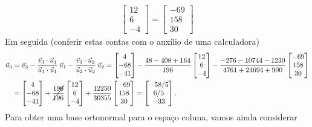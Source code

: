 \documentclass[../livro.tex]{subfiles}  %
\begin{document}
\begin{example}
\begin{equation}
\begin{split}
\begin{bmatrix}
12 \\
6 \\
-4
\end{bmatrix} =
\begin{bmatrix}
 -69  \\
 158  \\
 30
\end{bmatrix}
\end{split}
\end{equation} Em seguida (conferir estas contas com o auxílio de uma calculadora)
\begin{equation}
\begin{split}
\vec{u}_3 & = \vec{v}_3 - \frac{\vec{v}_3 \cdot \vec{u}_1}{\vec{u}_1 \cdot \vec{u}_1} \, \vec{u}_1 - \frac{\vec{v}_3 \cdot \vec{u}_2}{\vec{u}_2 \cdot \vec{u}_2} \, \vec{u}_2 = \begin{bmatrix}
  4 \\
 -68 \\
 -41
\end{bmatrix} - \frac{48-408 + 164}{196}
\begin{bmatrix}
12 \\
6 \\
-4
\end{bmatrix} - \frac{-276 - 10744 - 1230}{4761 + 24694 + 900}
\begin{bmatrix}
 -69  \\
 158  \\
 30
\end{bmatrix} \\
   & = \begin{bmatrix}
  4 \\
 -68 \\
 -41
\end{bmatrix} + \cancel{\frac{196}{196}}
\begin{bmatrix}
12 \\
6 \\
-4
\end{bmatrix} + \frac{12250}{30355}
\begin{bmatrix}
 -69  \\
 158  \\
 30
\end{bmatrix} = \begin{bmatrix}
 -58/5  \\
 6/5  \\
 -33
\end{bmatrix}.
\end{split}
\end{equation} Para obter uma base ortonormal para o espaço coluna, vamos ainda considerar

\end{example}
\end{document}
